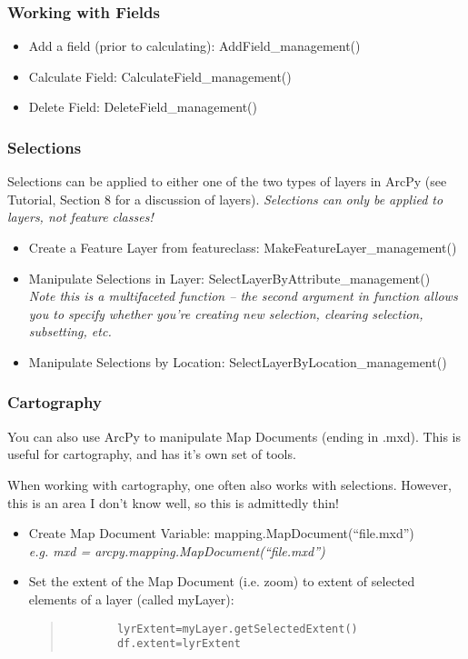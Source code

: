 \documentclass[12pt]{article}
\begin{document}
\subsubsection*{Working with Fields}
\begin{itemize}
	\item Add a field (prior to calculating): AddField\_management()
	\item Calculate Field: CalculateField\_management()
	\item Delete Field: DeleteField\_management()
\end{itemize}
	
\subsubsection*{Selections}
Selections can be applied to either one of the two types of layers in ArcPy (see Tutorial, Section 8 for a discussion of layers). 	\emph{Selections can only be applied to layers, not feature classes!}
\begin{itemize}
	\item Create a Feature Layer from featureclass: MakeFeatureLayer\_management()	\\
	\item Manipulate Selections in Layer: SelectLayerByAttribute\_management() \\
	\emph{Note this is a multifaceted function -- the second argument in function allows you to specify whether you're creating new selection, clearing selection, subsetting, etc.}
	\item Manipulate Selections by Location: SelectLayerByLocation\_management() 
\end{itemize}

\subsubsection*{Cartography}
You can also use ArcPy to manipulate Map Documents (ending in .mxd). This is useful for cartography, and has it's own set of tools. 

When working with cartography, one often also works with selections. However, this is an area I don't know well, so this is admittedly thin!
\begin{itemize}
	\item Create Map Document Variable: mapping.MapDocument(``file.mxd'') \\
	\emph{e.g. mxd = arcpy.mapping.MapDocument(``file.mxd'')}
	\item Set the extent of the Map Document (i.e. zoom) to extent of selected elements of a layer (called myLayer): 
	\begin{quotation}
	\begin{verbatim}
		lyrExtent=myLayer.getSelectedExtent()
		df.extent=lyrExtent
	\end{verbatim}		
	\end{quotation}
\end{itemize} 
\end{document}
